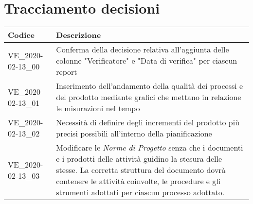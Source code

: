 \section{Tracciamento decisioni}
\renewcommand{\arraystretch}{1.8}

\begin{longtable}{|p{5cm}|p{8cm}|}
	\hline
	
	\rowcolor{header}
	\textbf{Codice} & \textbf{Descrizione} \\
	
	\hline
	
	VE\_2020-02-13\_00 & Conferma della decisione relativa all'aggiunta delle colonne "Verificatore" e "Data di verifica" per ciascun report \\
	VE\_2020-02-13\_01 & Inserimento dell'andamento della qualità dei processi e del prodotto mediante grafici che mettano in relazione le misurazioni nel tempo\\
	VE\_2020-02-13\_02 & Necessità di definire degli incrementi del prodotto più precisi possibili all'interno della pianificazione\\
	VE\_2020-02-13\_03 & Modificare le \textit{Norme di Progetto\doc} senza che i documenti e i prodotti delle attività guidino la stesura delle stesse. La corretta struttura del documento dovrà contenere le attività coinvolte, le procedure e gli strumenti adottati per ciascun processo adottato.\\
	\hline
\end{longtable}